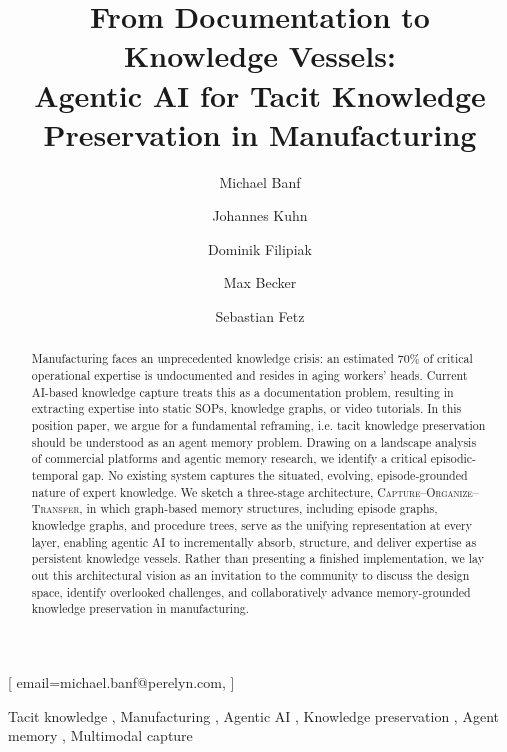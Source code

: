 \documentclass[]{ceurart}
\begin{document}


\title{From Documentation to Knowledge Vessels:\\Agentic AI for Tacit
  Knowledge Preservation in Manufacturing}

\author{Michael Banf}[%
  email=michael.banf@perelyn.com,
]
\cormark[1]
\author{Johannes Kuhn}

\author{Dominik Filipiak}

\author{Max Becker}

\author{Sebastian Fetz}

\address{Perelyn GmbH, Munich, Germany}


\begin{abstract}
Manufacturing faces an unprecedented knowledge crisis: an estimated 70\%
of critical operational expertise is undocumented and resides in aging
workers' heads. Current AI-based knowledge capture treats this as a
documentation problem, resulting in extracting expertise into static SOPs,
knowledge graphs, or video tutorials. In this position paper, we argue
for a fundamental reframing, i.e. tacit knowledge preservation should be
understood as an agent memory problem. Drawing on a landscape
analysis of commercial platforms and agentic memory research,
we identify a critical episodic-temporal gap. No existing system
captures the situated, evolving, episode-grounded nature of expert
knowledge. We sketch a three-stage
architecture, \textsc{Capture}--\textsc{Organize}--\textsc{Transfer}, in
which graph-based memory structures, including episode graphs, knowledge graphs, and 
procedure trees, serve as the unifying representation at every layer,
enabling agentic AI to incrementally absorb, structure, and deliver
expertise as persistent knowledge vessels. Rather than presenting
a finished implementation, we lay out this architectural vision as an invitation
to the community to discuss the design space, identify overlooked
challenges, and collaboratively advance memory-grounded knowledge
preservation in manufacturing.
\end{abstract}

\begin{keywords}
  Tacit knowledge \sep
  Manufacturing \sep
  Agentic AI \sep
  Knowledge preservation \sep
  Agent memory \sep
  Multimodal capture
\end{keywords}
\end{document}
